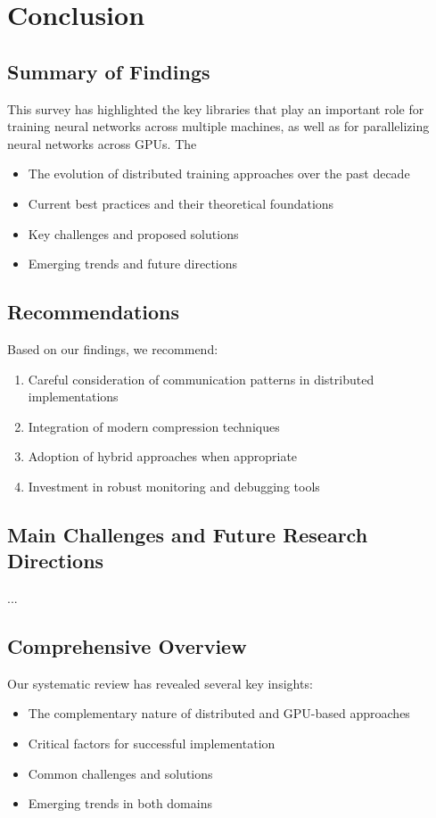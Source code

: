\section{Conclusion}
\label{sec:conclusion}

\subsection{Summary of Findings}
This survey has highlighted the key libraries that play an important role for training neural networks
across multiple machines, as well as for parallelizing neural networks across GPUs. The 

\begin{itemize}
    \item The evolution of distributed training approaches over the past decade
    \item Current best practices and their theoretical foundations
    \item Key challenges and proposed solutions
    \item Emerging trends and future directions
\end{itemize}

\subsection{Recommendations}
Based on our findings, we recommend:
\begin{enumerate}
    \item Careful consideration of communication patterns in distributed implementations
    \item Integration of modern compression techniques
    \item Adoption of hybrid approaches when appropriate
    \item Investment in robust monitoring and debugging tools
\end{enumerate}

\subsection{Main Challenges and Future Research Directions}
...


\subsection{Comprehensive Overview}
Our systematic review has revealed several key insights:
\begin{itemize}
    \item The complementary nature of distributed and GPU-based approaches
    \item Critical factors for successful implementation
    \item Common challenges and solutions
    \item Emerging trends in both domains
\end{itemize}

